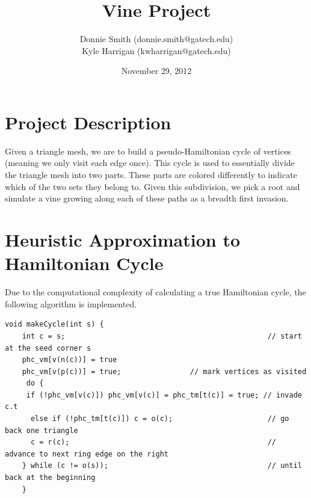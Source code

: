 \documentclass[letterpaper,10pt]{IEEEtran}
\title{Vine Project}
\author{
Donnie Smith (donnie.smith@gatech.edu) \\
Kyle Harrigan (kwharrigan@gatech.edu) 
}
\date{November 29, 2012}                                           %
\begin{document}


\maketitle

 
 
 


\section{Project Description}

Given a triangle mesh, we are to build a pseudo-Hamiltonian cycle of vertices (meaning we only visit each edge once).   This cycle is used to essentially divide the triangle mesh into two parts.  These parts are colored differently to indicate which of the two sets they belong to.  Given this subdivision, we pick a root and simulate a vine growing along each of these paths as a breadth first invasion. 

\section{Heuristic Approximation to Hamiltonian Cycle }

Due to the computational complexity of calculating a true Hamiltonian cycle, the following algorithm \cite{lr} is implemented. 


{\tiny
\begin{verbatim}
void makeCycle(int s) {
    int c = s;                                               // start at the seed corner s
    phc_vm[v(n(c))] = true
    phc_vm[v(p(c))] = true;                // mark vertices as visited
     do {
     if (!phc_vm[v(c)]) phc_vm[v(c)] = phc_tm[t(c)] = true; // invade c.t
      else if (!phc_tm[t(c)]) c = o(c);                      // go back one triangle
      c = r(c);                                              // advance to next ring edge on the right
    } while (c != o(s));                                     // until back at the beginning
    }
\end{verbatim}
}
\end{document}

